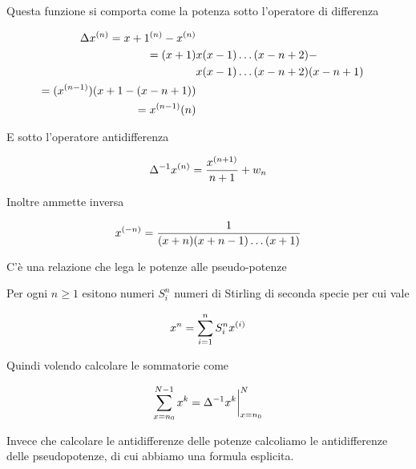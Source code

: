 Questa funzione si comporta come la potenza sotto l'operatore di differenza

\begin{align*}
	\Delta x^{(n)}
	=
	x+1^{(n)} - x^{(n)}
	\\
	=
		(x+1) &x (x-1) \dots (x-n+2) -
		\\
		&x (x-1) \dots (x-n+2)(x-n+1)
	\\
	=
		(x^{(n-1)})(x+1 - (x-n+1))
	\\
	=
		x^{(n-1)}(n)
\end{align*}

E sotto l'operatore antidifferenza

\begin{equation}
	\Delta^{-1} x^{(n)}
	=
	\frac{
		x^{(n+1)}
	}{
		n+1
	}
	+
	w_n
\end{equation}

Inoltre ammette inversa

\begin{equation}
	x^{(-n)}
	=
	\frac{
        1
	}{
		(x+n) (x+n-1) \dots (x+1)
	}
\end{equation}

C'è una relazione che lega le potenze alle pseudo-potenze

\begin{theorem}
	Per ogni $n \geq 1$ esitono numeri $S_{i}^{n}$ numeri di Stirling di seconda specie per cui vale
	
	\begin{equation}
		x^n
		=
		\sum
			\limits_{i=1}^{n}
				S_{i}^{n}
				x^{(i)}
	\end{equation}
\end{theorem}

Quindi volendo calcolare le sommatorie come

\begin{equation}
	\sum
		\limits_{x=n_0}^{N-1}
		x^k
	=
	\Delta^{-1} x^k \bigg \rvert_{x=n_0}^{N}
\end{equation}

Invece che calcolare le antidifferenze delle potenze calcoliamo le antidifferenze delle pseudopotenze, di cui abbiamo una formula esplicita.

